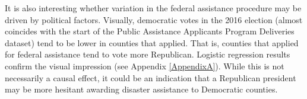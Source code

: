 It is also interesting whether variation in the federal assistance procedure may be driven by political factors. Visually, democratic votes in the 2016 election (almost coincides with the start of the Public Assistance Applicants Program Deliveries dataset) tend to be lower in counties that applied. That is, counties that applied for federal assistance tend to vote more Republican. Logistic regression results confirm the visual impression (see Appendix \ref{AppendixA}). While this is not necessarily a causal effect, it could be an indication that a Republican president may be more hesitant awarding disaster assistance to Democratic counties.


